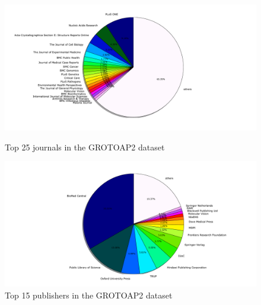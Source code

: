 \begin{figure}
  \centering
  \centerline{\includegraphics[width=22cm]{plots/journals_pieplot}}
  \label{fig:journals_pieplot}
  \caption{Top 25 journals in the GROTOAP2 dataset}
  \centerline{\includegraphics[width=22cm]{plots/publishers_pieplot}}
  \caption{Top 15 publishers in the GROTOAP2 dataset}
  \label{fig:publishers_pieplot}
\end{figure}

